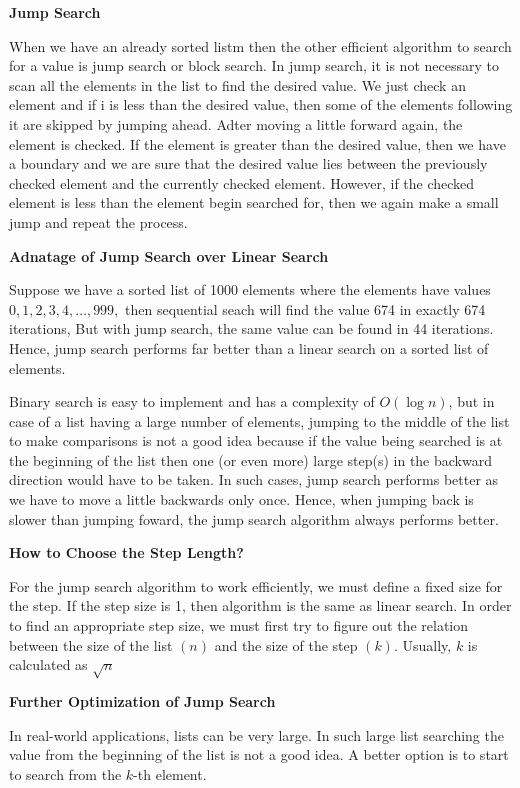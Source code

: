 \filbreak
\vskip 1cm
{\bf Jump Search}

\vskip 1mm
When we have an already sorted listm then the other efficient algorithm to search for a value is jump search or block search. In jump search, it is not necessary to scan all the elements in the list to find the desired value. We just check an element and if i is less than the desired value, then some of the elements following it are skipped by jumping ahead. Adter moving a little forward again, the element is checked. If the element is greater than the desired value, then we have a boundary and we are sure that the desired value lies between the previously checked element and the currently checked element. However, if the checked element is less than the element begin searched for, then we again make a small jump and repeat the process.

\vskip 3mm
{\bf Adnatage of Jump Search over Linear Search}

\vskip 1mm
Suppose we have a sorted list of 1000 elements where the elements have values $0,1,2,3,4,\ldots,999,$ then sequential seach will find the value 674 in exactly 674 iterations, But with jump search, the same value can be found in 44 iterations. Hence, jump search performs far better than a linear search on a sorted list of elements.

\vskip 3mm
Binary search is easy to implement and has a complexity of $O(\log n)$, but in case of a list having a large number of elements, jumping to the middle of the list to make comparisons is not a good idea because if the value being searched is at the beginning of the list then one (or even more) large step(s) in the backward direction would have to be taken. In such cases, jump search performs better as we have to move a little backwards only once. Hence, when jumping back is slower than jumping foward, the jump search algorithm always performs better.

\vskip 3mm
{\bf How to Choose the Step Length?}

\vskip 1mm
For the jump search algorithm to work efficiently, we must define a fixed size for the step. If the step size is 1, then algorithm is the same as linear search. In order to find an appropriate step size, we must first try to figure out the relation between the size of the list $(n)$ and the size of the step $(k)$. Usually, $k$ is calculated as $\sqrt{n}$

\vskip 3mm
{\bf Further Optimization of Jump Search}

\vskip 1mm
In real-world applications, lists can be very large. In such large list searching the value from the beginning of the list is not a good idea. A better option is to start to search from the $k$-th element.

